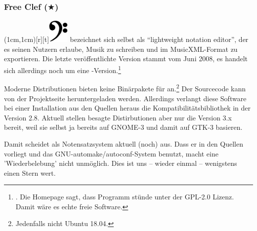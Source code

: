 %
%
%

\subsubsection{Free Clef ($\bigstar$)}

\parpic(1cm,1cm)[r][t]{\includegraphics[width=1cm]{logos/freeclef-700dpi.png}}
\label{FreeClef} bezeichnet sich selbst als \enquote{lightweight
notation editor}, der es seinen Nutzern erlaube, Musik zu schreiben und im
MusicXML-Format zu exportieren. Die letzte veröffentlichte Version stammt vom
Juni 2008, es handelt sich allerdings noch um eine
-Version.\footnote{\cite[vgl.][\nopage wp]{FreeClef2008a}. Die Homepage
sagt, dass Programm stünde unter der GPL-2.0 Lizenz. Damit wäre es echte freie
Software.}

Moderne Distributionen bieten keine Binärpakete für 
an.\footnote{Jedenfalls nicht Ubuntu 18.04.} Der Sourcecode kann von der
Projektseite heruntergeladen werden. Allerdings verlangt diese Software bei
einer Installation aus den Quellen heraus die Kompatibilitätsbibliothek
 in der Version 2.8. Aktuell stellen besagte Distirbutionen aber
nur die Version 3.x bereit, weil sie selbst ja bereits auf GNOME-3 und damit auf
GTK-3 basieren.

Damit scheidet  als Notensatzsystem aktuell (noch) aus. Dass er
in den Quellen vorliegt und das GNU-automake/autoconf-System benutzt, macht eine
'Wiederbelebung' nicht unmöglich. Dies ist uns -- wieder einmal -- wenigstens
einen Stern wert.



%
